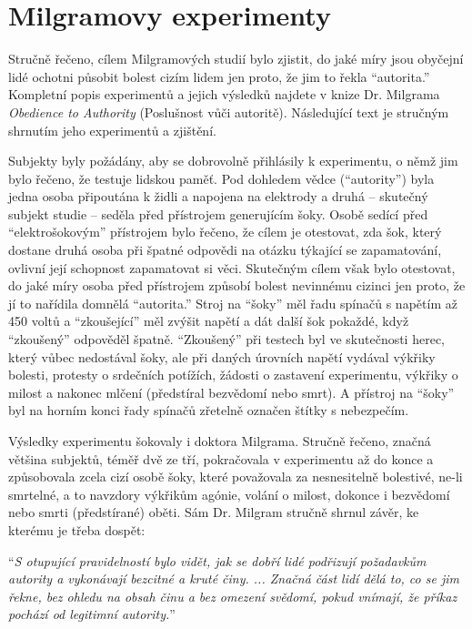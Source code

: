 \documentclass{book}
\begin{document}
\section{Milgramovy experimenty}

Stručně řečeno, cílem Milgramových studií bylo zjistit, do jaké míry jsou obyčejní lidé ochotni působit bolest cizím lidem jen proto, že jim to řekla \enquote{autorita.} Kompletní popis experimentů a jejich výsledků najdete v knize Dr. Milgrama \emph{Obedience to Authority} (Poslušnost vůči autoritě). Následující text je stručným shrnutím jeho experimentů a zjištění.

Subjekty byly požádány, aby se dobrovolně přihlásily k experimentu, o němž jim bylo řečeno, že testuje lidskou paměť. Pod dohledem vědce (\enquote{autority}) byla jedna osoba připoutána k židli a napojena na elektrody a druhá -- skutečný subjekt studie -- seděla před přístrojem generujícím šoky. Osobě sedící před \enquote{elektrošokovým} přístrojem bylo řečeno, že cílem je otestovat, zda šok, který dostane druhá osoba při špatné odpovědi na otázku týkající se zapamatování, ovlivní její schopnost zapamatovat si věci. Skutečným cílem však bylo otestovat, do jaké míry osoba před přístrojem způsobí bolest nevinnému cizinci jen proto, že jí to nařídila domnělá \enquote{autorita.} Stroj na \enquote{šoky} měl řadu spínačů s napětím až 450 voltů a \enquote{zkoušející} měl zvýšit napětí a dát další šok pokaždé, když \enquote{zkoušený} odpověděl špatně. \enquote{Zkoušený} při testech byl ve skutečnosti herec, který vůbec nedostával šoky, ale při daných úrovních napětí vydával výkřiky bolesti, protesty o srdečních potížích, žádosti o zastavení experimentu, výkřiky o milost a nakonec mlčení (předstíral bezvědomí nebo smrt). A přístroj na \enquote{šoky} byl na horním konci řady spínačů zřetelně označen štítky s nebezpečím.

Výsledky experimentu šokovaly i doktora Milgrama. Stručně řečeno, značná většina subjektů, téměř dvě ze tří, pokračovala v experimentu až do konce a způsobovala zcela cizí osobě šoky, které považovala za nesnesitelně bolestivé, ne-li smrtelné, a to navzdory výkřikům agónie, volání o milost, dokonce i bezvědomí nebo smrti (předstírané) oběti. Sám Dr. Milgram stručně shrnul závěr, ke kterému je třeba dospět:

\enquote{\emph{S otupující pravidelností bylo vidět, jak se dobří lidé podřizují požadavkům autority a vykonávají bezcitné a kruté činy. ... Značná část lidí dělá to, co se jim řekne, bez ohledu na obsah činu a bez omezení svědomí, pokud vnímají, že příkaz pochází od legitimní autority.}}
\end{document}
